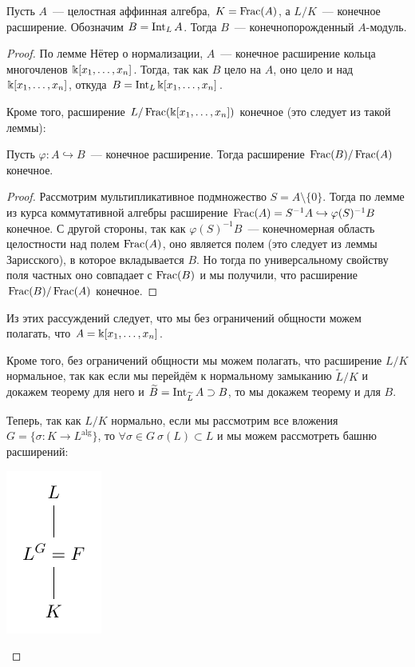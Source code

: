 	\begin{theorem} 
		Пусть $A$~--- целостная аффинная алгебра, $K = \operatorname{Frac}(A)$, а $L/K$~--- конечное расширение. Обозначим $B = \operatorname{Int}_{L}A$. Тогда $B$~--- конечнопорожденный $A$-модуль. 
	\end{theorem}
	\begin{proof}
		По лемме Нётер о нормализации, $A$~--- конечное расширение кольца многочленов $\Bbbk[x_1, \ldots, x_n]$. Тогда, так как $B$ цело на $A$, оно цело и над $\Bbbk[x_1, \ldots, x_n]$, откуда $B = \operatorname{Int}_{L}\Bbbk[x_1, \ldots, x_n]$. 

		Кроме того, расширение $L/\operatorname{Frac}(\Bbbk[x_1, \ldots ,x_n])$ конечное (это следует из такой леммы): 

		\begin{lemma} 
			Пусть $\varphi\colon A \hookrightarrow B$~--- конечное расширение. Тогда расширение $\operatorname{Frac}(B)/\operatorname{Frac}(A)$ конечное.
		\end{lemma}
		\begin{proof}
			Рассмотрим мультипликативное подмножество $S = A \setminus \{ 0 \}$. Тогда по лемме из курса коммутативной алгебры расширение $\operatorname{Frac}(A) = S^{-1}A \hookrightarrow \varphi(S)^{-1}B$ конечное. С другой стороны, так как $\varphi(S)^{-1}B$~--- конечномерная область целостности над полем $\operatorname{Frac}(A)$, оно является полем (это следует из леммы Зарисского), в которое вкладывается $B$. Но тогда по универсальному свойству поля частных оно совпадает с $\operatorname{Frac}(B)$ и мы получили, что расширение $\operatorname{Frac}(B)/\operatorname{Frac}(A)$ конечное. 
		\end{proof}

		Из этих рассуждений следует, что мы без ограничений общности можем полагать, что $A = \Bbbk[x_1, \ldots, x_n]$. 

		Кроме того, без ограничений общности мы можем полагать, что расширение $L/K$ нормальное, так как если мы перейдём к нормальному замыканию $\widetilde{L}/K$ и докажем теорему для него и $\widetilde{B} = \operatorname{Int}_{\widetilde{L}}{A} \supset B$, то мы докажем теорему и для $B$.

		Теперь, так как $L/K$ нормально, если мы рассмотрим все вложения $G = \{ \sigma \colon K \to L^{\mathrm{alg}} \}$, то $\forall \sigma \in G \ \sigma(L) \subset L$ и мы можем рассмотреть башню расширений: 

		\begin{center}
			\includegraphics{lectures/5/pictures/cd_7.pdf}
		\end{center}


\end{proof}

